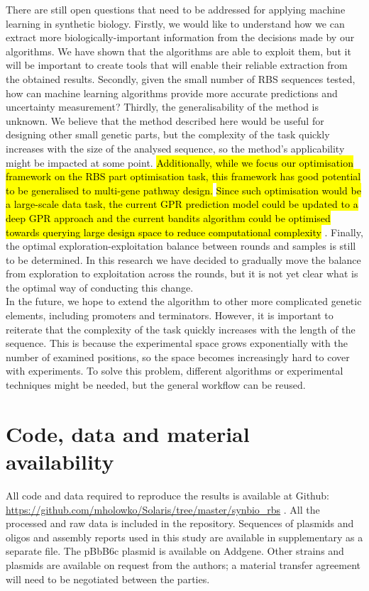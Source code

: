 \documentclass{article}
\begin{document}
There are still open questions that need to be addressed for applying machine learning in synthetic biology.
Firstly, we would like to understand how we can extract more biologically-important information from the decisions made by our algorithms.
We have shown that the algorithms are able to exploit them, but it will be important to create tools that will enable their reliable extraction from the obtained results.
Secondly, given the small number of RBS sequences tested, how can machine learning algorithms provide more accurate predictions and uncertainty measurement?
Thirdly, the generalisability of the method is unknown.
We believe that the method described here would be useful for designing other small genetic parts, but the complexity of the task quickly increases with the size of the analysed sequence, so the method's applicability might be impacted at some point.
\hl{Additionally, while we focus our optimisation framework on the RBS part optimisation task, this framework has good potential to be generalised to multi-gene pathway design.}
\hl{Since such optimisation would be a large-scale data task, the current GPR prediction model could be updated to a deep GPR approach and the current bandits algorithm could be optimised towards querying large design space to reduce computational complexity } \cite{Shahriari2016}.
Finally, the optimal exploration-exploitation balance between rounds and samples is still to be determined.
In this research we have decided to gradually move the balance from exploration to exploitation across the rounds, but it is not yet clear what is the optimal way of conducting this change.\\

In the future, we hope to extend the algorithm to other more complicated genetic elements, including promoters and terminators.
However, it is important to reiterate that the complexity of the task quickly increases with the length of the sequence.
This is because the experimental space grows exponentially with the number of examined positions, so the space becomes increasingly hard to cover with experiments.
To solve this problem, different algorithms or experimental techniques might be needed, but the general workflow can be reused.\\


\section*{Code, data and material availability}

All code and data required to reproduce the results is available at Github: \url{https://github.com/mholowko/Solaris/tree/master/synbio_rbs} .
All the processed and raw data is included in the repository.
Sequences of plasmids and oligos and assembly reports used in this study are available in supplementary as a separate file.
The pBbB6c plasmid is available on Addgene. Other strains and plasmids are available on request from the authors; a material transfer agreement will need to be negotiated between the parties.
\end{document}
